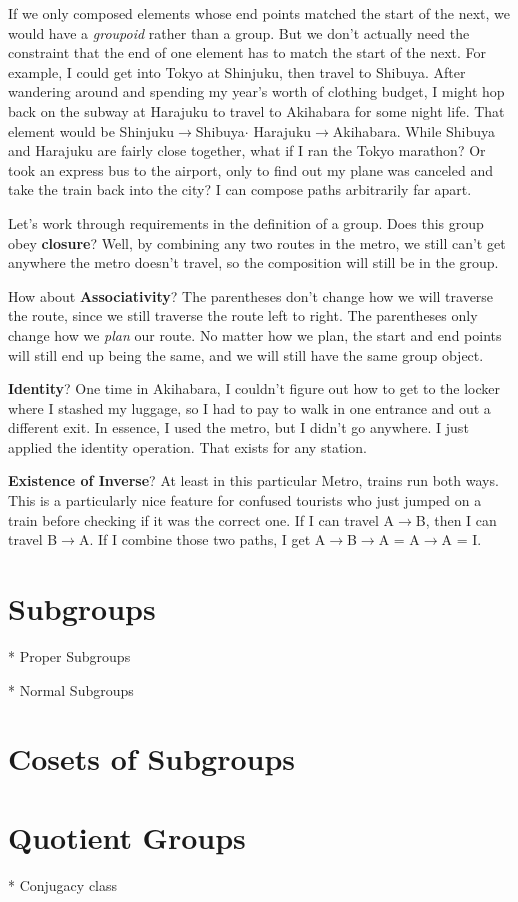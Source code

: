 If we only composed elements whose end points matched the start of the next, we would have a \textit{groupoid} rather than a group.   But we don't actually need the constraint that the end of one element has to match the start of the next.  For example, I could get into Tokyo at Shinjuku, then travel to Shibuya.  After wandering around and spending my year's worth of clothing budget, I might hop back on the subway at Harajuku to travel to Akihabara for some night life.  That element would be Shinjuku$\rightarrow$Shibuya$\cdot$ Harajuku$\rightarrow$Akihabara.  While Shibuya and Harajuku are fairly close together, what if I ran the Tokyo marathon? Or took an express bus to the airport, only to find out my plane was canceled and take the train back into the city?  I can compose paths arbitrarily far apart.

Let's work through requirements in the definition of a group.  Does this group obey \textbf{closure}?  Well, by combining any two routes in the metro, we still can't get anywhere the metro doesn't travel, so the composition will still be in the group.

How about \textbf{Associativity}?  The parentheses don't change how we will traverse the route, since we still traverse the route left to right.  The parentheses only change how we \textit{plan} our route.  No matter how we plan, the start and end points will still end up being the same, and we will still have the same group object.

\textbf{Identity}? One time in Akihabara, I couldn't figure out how to get to the locker where I stashed my luggage, so I had to pay to walk in one entrance and out a different exit.  In essence, I used the metro, but I didn't go anywhere.  I just applied the identity operation.  That exists for any station.

\textbf{Existence of Inverse}?  At least in this particular Metro, trains run both ways. This is a particularly nice feature for confused tourists who just jumped on a train before checking if it was the correct one. If I can travel A$\rightarrow$B, then I can travel B$\rightarrow$A.  If I combine those two paths, I get A$\rightarrow$B$\rightarrow$A = A$\rightarrow$A = I.

\section{Subgroups}

* Proper Subgroups

* Normal Subgroups

\section{Cosets of Subgroups}


\section{Quotient Groups}

* Conjugacy class
